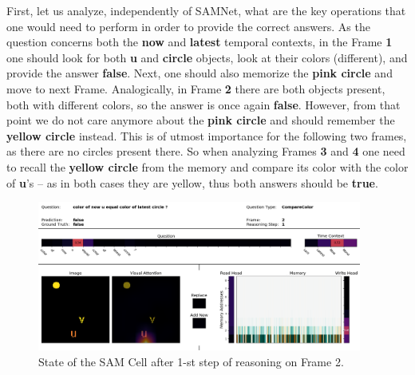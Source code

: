 First, let us analyze, independently of SAMNet, what are the key operations that one would need to perform in order to provide the correct answers. 
As the question concerns both the \textbf{now} and \textbf{latest} temporal contexts, in the Frame \textbf{1} one should look for both \textbf{u} and \textbf{circle} objects, look at their colors (different), and provide the answer \textbf{false}.
Next, one should also memorize the \textbf{pink circle} and move to next Frame.
Analogically, in Frame \textbf{2} there are both objects present, both with different colors, so the answer is once again \textbf{false}.
However, from that point we do not care anymore about the \textbf{pink circle} and should remember the \textbf{yellow circle} instead.
This is of utmost importance for the following two frames, as there are no circles present there.
So when analyzing Frames \textbf{3} and \textbf{4} one need to recall the \textbf{yellow circle} from the memory and compare its color with the color of \textbf{u}'s -- as in both cases they are yellow, thus  both answers should be \textbf{true}.

\begin{figure}[!h]
	\centering
	\includegraphics[width=0.95\textwidth]{"../img/visualization/experiment_run_20190917_022319/Frame 2 Step 1"}
	\caption{State of the SAM Cell after 1-st step of reasoning on Frame 2.} 
	\label{fig:frame-2-step-1-app}
\end{figure}

